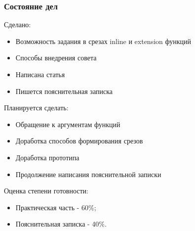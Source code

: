 \documentclass{beamer}
\begin{document}
	\begin{frame}
		\frametitle{Состояние дел}
        Сделано:
		\begin{itemize}
            \item Возможность задания в срезах inline и extension функций
            \item Способы внедрения совета
            \item Написана статья
            \item Пишется пояснительная записка
        \end{itemize}

        Планируется сделать:
        \begin{itemize}
            \item Обращение к аргументам функций
            \item Доработка способов формирования срезов
            \item Доработка прототипа
            \item Продолжение написания пояснительной записки
        \end{itemize}
        Оценка степени готовности:
        \begin{itemize}
            \item Практическая часть - 60\%;
            \item Пояснительная записка - 40\%.
        \end{itemize}
    \end{frame}
\end{document}

